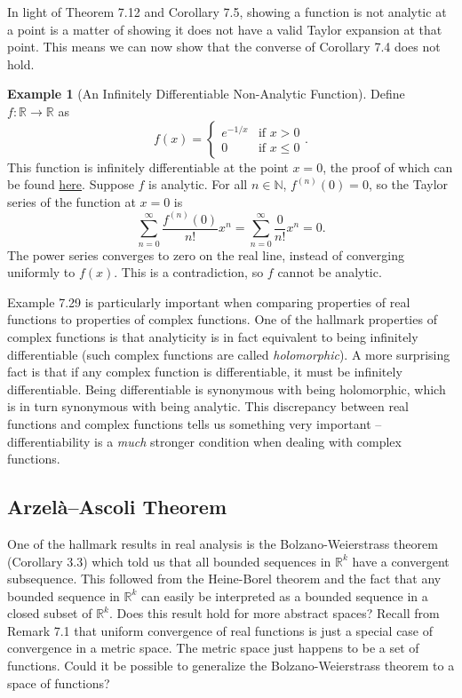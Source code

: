 \documentclass{article}
\newcommand{\N}{\mathbb{N}}
\newcommand{\R}{\mathbb{R}}
\theoremstyle{definition}
\newtheorem{example}{Example}[section]
\begin{document}
	In light of Theorem 7.12 and Corollary 7.5, showing a function is not analytic at a point is a matter of showing it does not have a valid Taylor expansion at that point. This means we can now show that the converse of Corollary 7.4 does not hold.
	\begin{example}[An Infinitely Differentiable Non-Analytic Function]
		Define $ f:\R\to\R $ as $$ f(x) =\begin{cases}
			e^{-1/x} &\text{if }x>0\\
			0&\text{if } x\le 0
		\end{cases}. $$
		This function is infinitely differentiable at the point $ x = 0 $, the proof of which can be found \href{https://en.wikipedia.org/wiki/Non-analytic_smooth_function}{here}. Suppose $ f $ is analytic. For all $ n\in \N $, $ f^{(n)}(0)=0 $, so the Taylor series of the function at $ x = 0 $ is 
		$$ \sum_{n=0}^{\infty}\frac{f^{(n)}(0)}{n!}x^n = \sum_{n=0}^{\infty}\frac{0}{n!}x^n = 0.$$
		The power series converges to zero on the real line, instead of converging uniformly to $ f(x) $. This is a contradiction, so $ f $ cannot be analytic.
	\end{example}
	
	Example 7.29 is particularly important when comparing properties of real functions to properties of complex functions. One of the hallmark properties of complex functions is that analyticity is in fact equivalent to being infinitely differentiable (such complex functions are called \textit{\color{red}holomorphic}). A more surprising fact is that if any complex function is differentiable, it must be infinitely differentiable. Being differentiable is synonymous with being holomorphic, which is in turn synonymous with being analytic. This discrepancy between real functions and complex functions tells us something very important -- differentiability is a \textit{much} stronger condition when dealing with complex functions. 
	
	\subsection{Arzelà–Ascoli Theorem}
	
	
	One of the hallmark results in real analysis is the Bolzano-Weierstrass theorem (Corollary 3.3) which told us that all bounded sequences in $\R^k$ have a convergent subsequence. This followed from the Heine-Borel theorem and the fact that any bounded sequence in $\R^k$ can easily be interpreted as a bounded sequence in a closed subset of $\R^k$. Does this result hold for more abstract spaces? Recall from Remark 7.1 that uniform convergence of real functions is just a special case of convergence in a metric space. The metric space just happens to be a set of functions. Could it be possible to generalize the Bolzano-Weierstrass theorem to a space of functions? 
	
\end{document}
